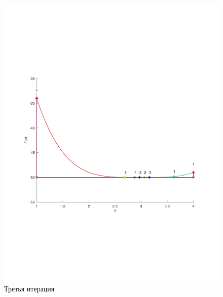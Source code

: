\documentclass[a4paper,12pt]{article}
\begin{document}
    \begin{figure}[H]
        \centering
        \includegraphics[scale=0.4]{3Bolcanoitter.pdf}
        \caption{Третья итерация}
    \end{figure}
\end{document}
